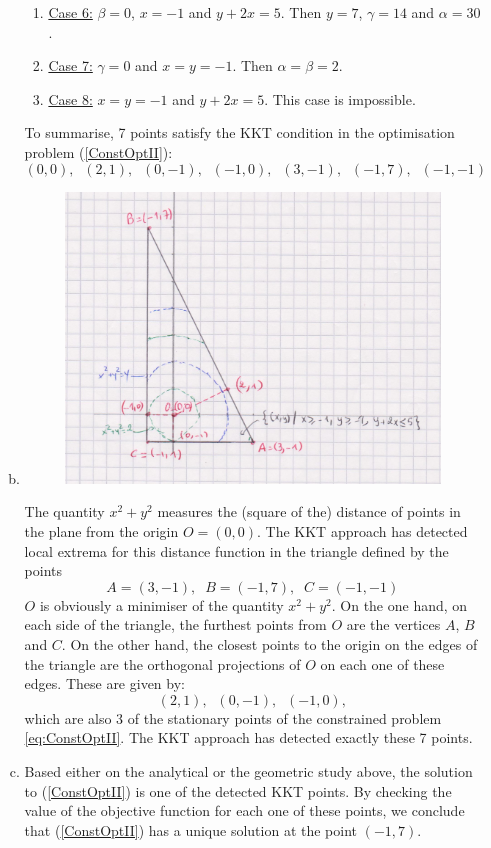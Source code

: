 \documentclass{ExerciseSheet}
\begin{document}
\begin{solution}
\begin{enumerate}[1.]
\begin{enumerate}[a.]
\begin{enumerate}
		\item \underline{Case 6:} $\beta=0$, $x=-1$ and $y+2x=5$. Then $y=7$, $\gamma=14$ and $\alpha=30$.
		\item \underline{Case 7:} $\gamma=0$ and $x=y=-1$. Then $\alpha=\beta=2$.
		\item \underline{Case 8:} $x=y= -1$ and $y+2x= 5$. This case is impossible.
		\end{enumerate}
		To summarise, 7 points satisfy the KKT condition in the optimisation problem (\ref{ConstOptII}):
		\[(0,0),\;\;
		(2,1),\;\;
		(0,-1),\;\;
		(-1,0),\;\;
		(3,-1),\;\;
		(-1,7),\;\;
		(-1,-1)\]
    	\item 	\begin{figure}[h]
	\includegraphics[scale=0.35]{ExoSheet7CurveLines}
	\centering
	\end{figure}
    	
    	
		The quantity $x^2+y^2$ measures the (square of the) distance of points in the plane from the origin $O=(0,0)$. The KKT approach has detected local extrema for this distance function in the triangle defined by the points
		\[A=(3,-1),\;\;B=(-1,7),\;\;C=(-1,-1)\] 
		 $O$ is obviously a minimiser of the quantity $x^2+y^2$. On the one hand, on each side of the triangle, the furthest points from $O$ are the vertices $A$, $B$ and $C$. On the other hand, the closest points to the origin on the edges of the triangle are the orthogonal projections of $O$ on each one of these edges. These are given by:
		 \[(2,1),\;\;
		(0,-1),\;\;
		(-1,0),\]
		which are also 3 of the stationary points of the constrained problem \eqref{eq:ConstOptII}.
		The KKT approach has detected exactly these 7 points.
   	 	\item Based either on the analytical or the geometric study above, the solution to (\ref{ConstOptII}) is one of the detected KKT points. By checking the value of the objective function for each one of these points, we conclude that (\ref{ConstOptII}) has a unique solution at the point $(-1,7)$.
		\end{enumerate}
	
\end{enumerate}

\end{solution}
\end{document}
